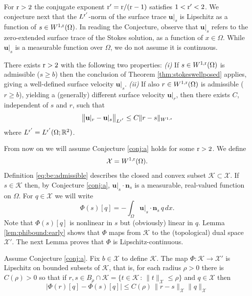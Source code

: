 \documentclass[hidelinks,onefignum,onetabnum,final]{siamart220329}  %
\newcommand{\RR}{\mathbb{R}}
\newcommand{\bn}{\mathbf{n}}
\newcommand{\bu}{\mathbf{u}}
\newcommand{\cK}{\mathcal{K}}
\newcommand{\cX}{\mathcal{X}}
\newcommand{\rr}{{\text{\textnormal{r}}}}
\begin{document}
For $\rr>2$ the conjugate exponent $\rr'=\rr/(\rr-1)$ satisfies $1<\rr'<2$.  We conjecture next that the $L^{\rr'}$-norm of the surface trace $\bu|_s$ is Lipschitz as a function of $s \in W^{1,\rr}(\Omega)$.  In reading the Conjecture, observe that $\bu|_s$ refers to the zero-extended surface trace of the Stokes solution, as a function of $x\in\Omega$.  While $\bu|_s$ is a measurable function over $\Omega$, we do not assume it is continuous.

\begin{conjecture} \label{conj:a}  There exists $\rr>2$ with the following two properties:  \emph{(i)} If $s\in W^{1,\rr}(\Omega)$ is admissible ($s\ge b$) then the conclusion of Theorem \ref{thm:stokeswellposed} applies, giving a well-defined surface velocity $\bu|_s$.  \emph{(ii)} If also $r\in W^{1,\rr}(\Omega)$ is admissible ($r\ge b$), yielding a (generally) different surface velocity $\bu|_r$, then there exists $C$, independent of $s$ and $r$, such that
\begin{equation}
\big\|\bu|_r - \bu|_s\big\|_{L^{\rr'}} \le C \|r-s\|_{W^{1,\rr}} \label{eq:ulipschitz}
\end{equation}
where $L^{\rr'}=L^{\rr'}(\Omega;\RR^2)$.
\end{conjecture}

From now on we will assume Conjecture \ref{conj:a} holds for some $\rr>2$.  We define
\begin{equation}
\cX = W^{1,\rr}(\Omega). \label{eq:defineX}
\end{equation}
Definition \eqref{eq:be:admissible} describes the closed and convex subset $\cK \subset \cX$.  If $s\in\cK$ then, by Conjecture \ref{conj:a}, $\bu|_s\cdot\bn_s$ is a measurable, real-valued function on $\Omega$.   For $q\in\cX$ we will write
\begin{equation}
\Phi(s)[q] = -\int_\Omega \bu|_s\cdot\bn_s\,q\,dx. \label{eq:definePhi}
\end{equation}
Note that $\Phi(s)[q]$ is nonlinear in $s$ but (obviously) linear in $q$.  Lemma \ref{lem:phibound:early} shows that $\Phi$ maps from $\cK$ to the (topological) dual space $\cX'$.  The next Lemma proves that $\Phi$ is Lipschitz-continuous.

\begin{lemma} \label{lem:philipschitz}
Assume Conjecture \ref{conj:a}.  Fix $b \in \cX$ to define $\cK$.  The map $\Phi:\cK\to\cX'$ is Lipschitz on bounded subsets of $\cK$, that is, for each radius $\rho>0$ there is $C(\rho)>0$ so that if $r,s\in B_\rho \cap \cK = \{t\in \cK\,:\,\|t\|_{\cX} \le \rho\}$ and $q\in\cX$ then
\begin{equation}
\big|\Phi(r)[q] - \Phi(s)[q]\big| \le C(\rho)\, \|r-s\|_{\cX} \|q\|_{\cX}  \label{eq:philipschitz}
\end{equation}
\end{lemma}
\end{document}
